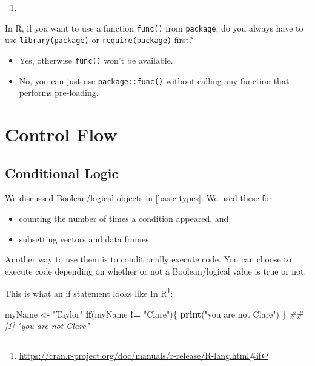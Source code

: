 \documentclass[12pt,krantz2]{krantz}
\makeatletter
\newenvironment{Shaded}{\begin{snugshade}}{\end{snugshade}}
\newcommand{\CommentTok}[1]{\textcolor[rgb]{0.37,0.37,0.37}{\textit{#1}}}
\newcommand{\ControlFlowTok}[1]{\textcolor[rgb]{0.27,0.27,0.27}{\textbf{#1}}}
\newcommand{\KeywordTok}[1]{\textcolor[rgb]{0.27,0.27,0.27}{\textbf{#1}}}
\newcommand{\NormalTok}[1]{#1}
\newcommand{\OperatorTok}[1]{\textcolor[rgb]{0.43,0.43,0.43}{\textbf{#1}}}
\newcommand{\StringTok}[1]{\textcolor[rgb]{0.5,0.5,0.5}{#1}}
\providecommand{\tightlist}{%
  \setlength{\itemsep}{0pt}\setlength{\parskip}{0pt}}
\renewcommand{\href}[2]{#2\footnote{\url{#1}}}
\newenvironment{kframe}{%
\medskip{}
\setlength{\fboxsep}{.8em}
 \def\at@end@of@kframe{}%
 \ifinner\ifhmode%
  \def\at@end@of@kframe{\end{minipage}}%
  \begin{minipage}{\columnwidth}%
 \fi\fi%
 \def\FrameCommand##1{\hskip\@totalleftmargin \hskip-\fboxsep
 \colorbox{shadecolor}{##1}\hskip-\fboxsep
     \hskip-\linewidth \hskip-\@totalleftmargin \hskip\columnwidth}%
 \MakeFramed {\advance\hsize-\width
   \@totalleftmargin\z@ \linewidth\hsize
   \@setminipage}}%
 {\par\unskip\endMakeFramed%
 \at@end@of@kframe}
\renewenvironment{Shaded}{\begin{kframe}}{\end{kframe}}
\makeatother
\begin{document}
\begin{enumerate}
\def\labelenumi{\arabic{enumi}.}
\setcounter{enumi}{4}
\item
\end{enumerate}

In R, if you want to use a function \texttt{func()} from \texttt{package}, do you always have to use \texttt{library(package)} or \texttt{require(package)} first?

\begin{itemize}
\tightlist
\item
  Yes, otherwise \texttt{func()} won't be available.
\item
  No, you can just use \texttt{package::func()} without calling any function that performs pre-loading.
\end{itemize}

\hypertarget{control-flow}{%
\chapter{Control Flow}\label{control-flow}}

\hypertarget{conditional-logic}{%
\section{Conditional Logic}\label{conditional-logic}}

We discussed Boolean/logical objects in \ref{basic-types}. We used these for

\begin{itemize}
\tightlist
\item
  counting the number of times a condition appeared, and
\item
  subsetting vectors and data frames.
\end{itemize}

Another way to use them is to conditionally execute code. You can choose to execute code depending on whether or not a Boolean/logical value is true or not.

This is what an \href{https://cran.r-project.org/doc/manuals/r-release/R-lang.html\#if}{if statement looks like In R}:

\begin{Shaded}
\begin{Highlighting}[]
\NormalTok{myName <-}\StringTok{ "Taylor"}
\ControlFlowTok{if}\NormalTok{(myName }\OperatorTok{!=}\StringTok{ "Clare"}\NormalTok{)\{}
  \KeywordTok{print}\NormalTok{(}\StringTok{"you are not Clare"}\NormalTok{)}
\NormalTok{\}}
\CommentTok{## [1] "you are not Clare"}
\end{Highlighting}
\end{Shaded}
\end{document}
